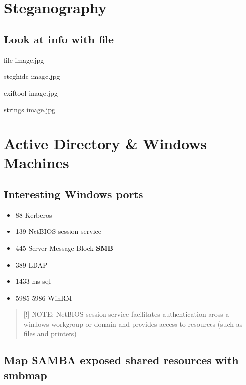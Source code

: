 \documentclass{assets/ipesethesis}
\providecommand{\tightlist}{%
  \setlength{\itemsep}{0pt}\setlength{\parskip}{0pt}}
\begin{document}
\hypertarget{steganography}{%
\chapter*{Steganography}\label{steganography}}

\hypertarget{look-at-info-with-file}{%
\section*{Look at info with file}\label{look-at-info-with-file}}

file image.jpg

steghide image.jpg

exiftool image.jpg

strings image.jpg

\hypertarget{active-directory-windows-machines}{%
\chapter*{Active Directory \& Windows Machines}\label{active-directory-windows-machines}}

\hypertarget{interesting-windows-ports}{%
\section*{Interesting Windows ports}\label{interesting-windows-ports}}

\begin{itemize}
\tightlist
\item
  88 Kerberos
\item
  139 NetBIOS session service
\item
  445 Server Message Block \textbf{SMB}
\item
  389 LDAP
\item
  1433 ms-sql
\item
  5985-5986 WinRM
\end{itemize}

\begin{quote}
{[}!{]} NOTE: NetBIOS session service facilitates authentication aross a windows workgroup or domain and provides access to resources (such as files and printers)
\end{quote}

\hypertarget{map-samba-exposed-shared-resources-with-smbmap}{%
\section*{Map SAMBA exposed shared resources with smbmap}\label{map-samba-exposed-shared-resources-with-smbmap}}
\end{document}
